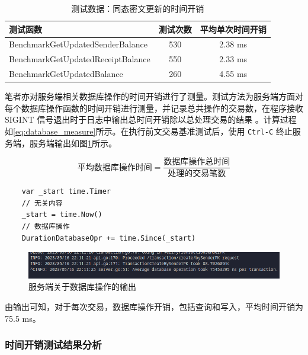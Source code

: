 \begin{table}[h]
    \centering
    \begin{tabular}{|l|c|c|}
        \hline
        测试函数 & 测试次数 & 平均单次时间开销 \\
        \hline
        BenchmarkGetUpdatedSenderBalance & 530 & 2.38 ms \\
        \hline
        BenchmarkGetUpdatedReceiptBalance & 550 & 2.33 ms \\
        \hline
        BenchmarkGetUpdatedBalance & 260 & 4.55 ms \\
        \hline
    \end{tabular}
    \caption{测试数据：同态密文更新的时间开销} \label{Tab:CTUpdate}
\end{table}

笔者亦对服务端相关数据库操作的时间开销进行了测量。测试方法为服务端方面对每个数据库操作函数的时间开销进行测量，并记录总共操作的交易数，在程序接收 SIGINT 信号退出时于日志中输出总时间开销除以总处理交易的结果 。计算过程如\eqref{eq:database_measure}所示。在执行前文交易基准测试后，使用 \texttt{Ctrl-C} 终止服务端，服务端输出如图\ref{Fig:bench_database_perf}所示。

\begin{equation} \label{eq:database_measure}
    \textrm{平均数据库操作时间} = \frac{\textrm{数据库操作总时间}}{\textrm{处理的交易笔数}}
\end{equation}

\begin{verbatim}
    var _start time.Timer
    // 无关内容
    _start = time.Now()
    // 数据库操作
    DurationDatabaseOpr += time.Since(_start)
\end{verbatim}

\begin{figure}[h]
    \centering
    \includegraphics[width=0.8\linewidth]{./Figures/Test_Database_Perf.png}
    \caption{服务端关于数据库操作的输出} \label{Fig:bench_database_perf}
\end{figure}

由输出可知，对于每次交易，数据库操作开销，包括查询和写入，平均时间开销为 75.5 ms。

\subsubsection{时间开销测试结果分析}

